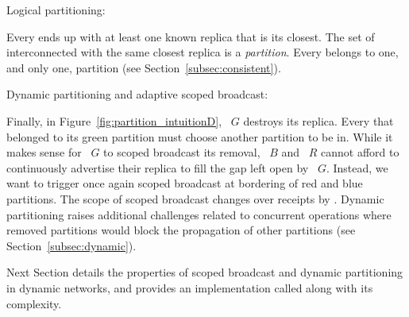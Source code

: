 \begin{asparadesc}
\item [Logical partitioning:]

Every \process ends up with at least one known replica that is its
closest. The set of interconnected \processes with the same closest
replica is a \emph{partition}. Every \process belongs to one, and only
one, partition (see Section~\ref{subsec:consistent}).


\item [Dynamic partitioning and adaptive scoped broadcast:]

Finally, in Figure~\ref{fig:partition_intuitionD}, \Process~$G$
destroys its replica. Every \process that belonged to its green
partition must choose another partition to be in. While it makes sense
for \Process~$G$ to scoped broadcast its removal, \Process~$B$ and
\Process~$R$ cannot afford to continuously advertise their replica to
fill the gap left open by \Process~$G$. Instead, we want to trigger
once again scoped broadcast at bordering \processes of red and blue
partitions. The scope of scoped broadcast changes over receipts by
\processes. Dynamic partitioning raises additional challenges related
to concurrent operations where removed partitions would block the
propagation of other partitions (see Section~\ref{subsec:dynamic}).
\end{asparadesc}

Next Section details the properties of scoped broadcast and dynamic
partitioning in dynamic networks, and provides an implementation
called \NAME along with its complexity.



